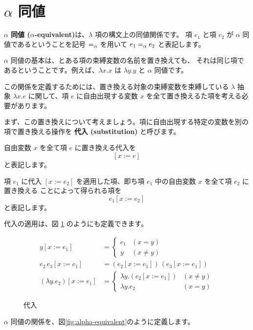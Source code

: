 \section{$\alpha$ 同値}

\textbf{$\alpha$ 同値 ($\alpha$-equivalent)}は、$\lambda$ 項の構文上の同値関係です。
項 $e_1$ と項 $e_2$ が $\alpha$ 同値であるということを記号 $=_\alpha$ を用いて
$e_1 =_\alpha e_2$ と表記します。

$\alpha$ 同値の基本は、とある項の束縛変数の名前を置き換えても、
それは同じ項であるということです。例えば、$\lambda x . x$ は $\lambda y . y$ と $\alpha$ 同値です。

この関係を定義するためには、置き換える対象の束縛変数を束縛している $\lambda$ 抽象
$\lambda x . e$ に関して、項 $e$ に自由出現する変数 $x$ を全て置き換えるた項を考える必要があります。

まず、この置き換えについて考えましょう。項に自由出現する特定の変数を別の項で置き換える操作を
\textbf{代入 (substitution)} と呼びます。

自由変数 $x$ を全て項 $e$ に置き換える代入を
\[
  [x := e]
\]
と表記します。

項 $e_1$ に代入 $[x := e_2]$ を適用した項、即ち項 $e_1$ 中の自由変数 $x$ を全て項 $e_2$ に置き換える
ことによって得られる項を
\[
  e_1 [x := e_2]
\]
と表記します。

代入の適用は、図 \ref{fig:lambda-substitute} のようにも定義できます。

\begin{figure}[htbp]
  \begin{align*}
    y [x := e_1] & = \left \{
      \begin{array}{ll}
        e_1 & (x = y) \\
        y & (x \neq y)
      \end{array}
      \right. \\
    e_2 \, e_3 [x := e_1] & = (e_2 [x := e_1]) \, (e_3 [x := e_1]) \\
    (\lambda y . e_2) [x := e_1] & = \left \{
      \begin{array}{ll}
        \lambda y . (e_2 [x := e_1]) & (x \neq y) \\
        \lambda y . e_2 & (x = y)
      \end{array}
      \right.
  \end{align*}
  \caption{代入}
  \label{fig:lambda-substitute}
\end{figure}

$\alpha$ 同値の関係を、図\ref{fig:alpha-equivalent}のように定義します。

